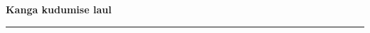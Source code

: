 \documentclass[10pt]{book}
\begin{document}
{
  \samepage
  \raggedbottom
  \raggedright
  \sloppy


  \vspace{0.2in}

  \noindent\begin{minipage}{.1\textwidth}
    \hfill\vspace{0.1in}
  \end{minipage}%
  \noindent\begin{minipage}{.8\textwidth}
    \centering
    \bfseries
    \large Kanga kudumise laul
  \end{minipage}%
  \noindent\begin{minipage}{.1\textwidth}
      \hfill\vspace{0.1in}
  \end{minipage}

  \nopagebreak[4]
  \vspace{0.1in}
  \nopagebreak[4]
  \hrule height 0.05ex
  \nopagebreak[4]
  \vspace{-0.05in}




}
\end{document}
